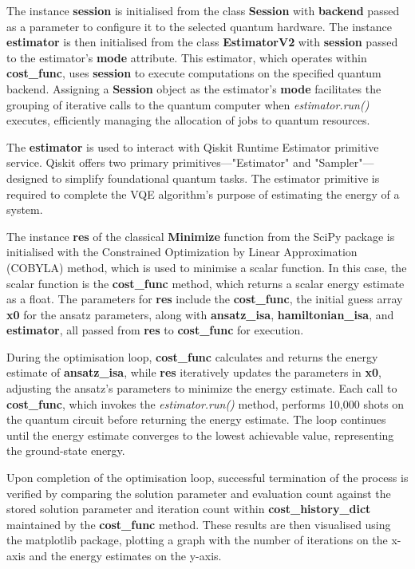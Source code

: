 \documentclass{article}
\begin{document}
The instance \textbf{session} is initialised from the class \textbf{Session} with \textbf{backend} passed as a parameter to configure it to the selected quantum hardware. The instance \textbf{estimator} is then initialised from the class \textbf{EstimatorV2} with \textbf{session} passed to the estimator's \textbf{mode} attribute. This estimator, which operates within \textbf{cost\_func}, uses \textbf{session} to execute computations on the specified quantum backend. Assigning a  \textbf{Session} object as the estimator's \textbf{mode} facilitates the grouping of iterative calls to the quantum computer\cite{Session} when \textit{estimator.run()} executes, efficiently managing the allocation of jobs to quantum resources.

The \textbf{estimator} is used to interact with Qiskit Runtime Estimator primitive service\cite{EstimatorV2}. Qiskit offers two primary primitives—"Estimator" and "Sampler"—designed to simplify foundational quantum tasks\cite{QiskitRuntime}. The estimator primitive is required to complete the VQE algorithm's purpose of estimating the energy of a system.

The instance \textbf{res} of the classical \textbf{Minimize} function from the SciPy package is initialised with the Constrained Optimization by Linear Approximation (COBYLA) method, which is used to minimise a scalar function. In this case, the scalar function is the \textbf{cost\_func} method, which returns a scalar energy estimate as a float. The parameters for \textbf{res} include the \textbf{cost\_func}, the initial guess array \textbf{x0} for the ansatz parameters, along with \textbf{ansatz\_isa}, \textbf{hamiltonian\_isa}, and \textbf{estimator}, all passed from \textbf{res} to \textbf{cost\_func} for execution. 

During the optimisation loop, \textbf{cost\_func} calculates and returns the energy estimate of \textbf{ansatz\_isa}, while \textbf{res} iteratively updates the parameters in \textbf{x0}, adjusting the ansatz's parameters to minimize the energy estimate. Each call to \textbf{cost\_func}, which invokes the \textit{estimator.run()} method, performs 10,000 shots on the quantum circuit before returning the energy estimate. The loop continues until the energy estimate converges to the lowest achievable value, representing the ground-state energy.

Upon completion of the optimisation loop, successful termination of the process is verified by comparing the solution parameter and evaluation count against the stored solution parameter and iteration count within \textbf{cost\_history\_dict} maintained by the \textbf{cost\_func} method. These results are then visualised using the matplotlib package, plotting a graph with the number of iterations on the x-axis and the energy estimates on the y-axis.
\end{document}

